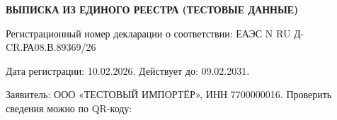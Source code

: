 \documentclass[a4paper,12pt]{article}
\begin{document}
\begin{center}\textbf{ВЫПИСКА ИЗ ЕДИНОГО РЕЕСТРА (ТЕСТОВЫЕ ДАННЫЕ)}\end{center}
Регистрационный номер декларации о соответствии: ЕАЭС N RU Д-CR.РА08.В.89369/26

Дата регистрации: 10.02.2026. Действует до: 09.02.2031.

Заявитель: ООО «ТЕСТОВЫЙ ИМПОРТЁР», ИНН 7700000016.
\newpage
Проверить сведения можно по QR-коду:

\end{document}
